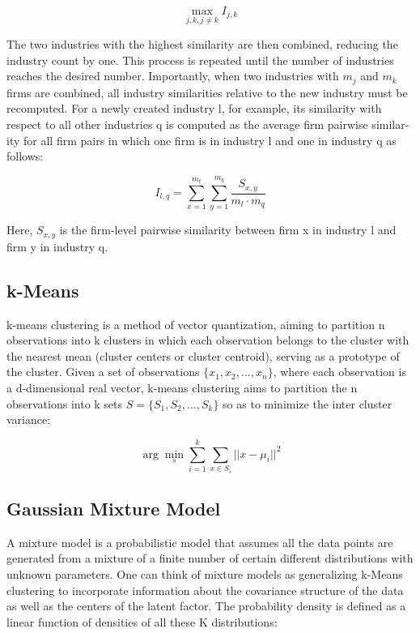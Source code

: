 \documentclass[12pt]{article}
\begin{document}
\begin{equation}
    \max_{j,k,j\neq k} I_{j,k}
\end{equation}

The two industries with the highest similarity are then combined, reducing the industry count by one. 
This process is repeated until the number of industries reaches the desired number. Importantly, when 
two industries with $m_j$ and $m_k$ firms are combined, all industry similarities relative to the new 
industry must be recomputed. For a newly created industry l, for example, its similarity with respect 
to all other industries q is computed as the average firm pairwise similar- ity for all firm pairs in 
which one firm is in industry l and one in industry q as follows:

\begin{equation}
    I_{l,q}=\sum_{x=1}^{m_t}\sum_{y=1}^{m_q} \frac{S_{x,y}}{m_l \cdot m_q}
\end{equation}

Here, $S_{x,y}$ is the firm-level pairwise similarity between firm x in industry l and firm y in industry q.

\subsection{k-Means}

k-means clustering is a method of vector quantization, aiming to partition n observations into k clusters 
in which each observation belongs to the cluster with the nearest mean (cluster centers or cluster 
centroid), serving as a prototype of the cluster.
Given a set of observations $\{x_1, x_2, ..., x_n\}$, where each observation is a d-dimensional real vector, 
k-means clustering aims to partition the n observations into k sets $S = \{S_1, S_2, ..., S_k\}$ so as to 
minimize the inter cluster variance:

\begin{equation}
    \arg\min_s\sum_{i=1}^k\sum_{x\in S_i}||x-\mu_i||^2
\end{equation}

\subsection{Gaussian Mixture Model}

A mixture model is a probabilistic model that assumes all the data points are generated from a mixture of a 
finite number of certain different distributions with unknown parameters. One can think of mixture models as 
generalizing k-Means clustering to incorporate information about the covariance structure of the data as well 
as the centers of the latent factor. The probability density is defined as a linear function of densities of 
all these K distributions:
\end{document}
